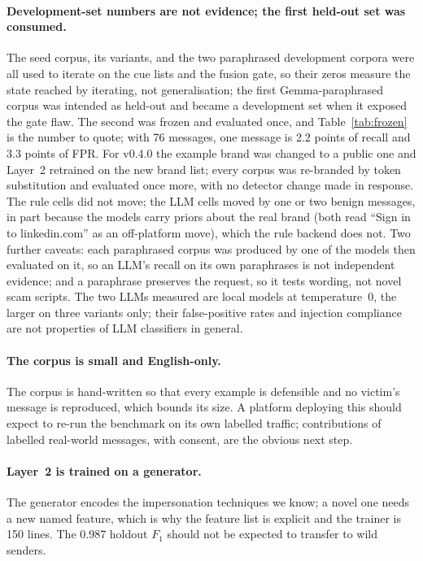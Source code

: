 \documentclass[10pt,twocolumn]{article}
\begin{document}
\paragraph{Development-set numbers are not evidence; the first held-out set was consumed.} The seed corpus, its variants, and the two paraphrased development corpora were all used to iterate on the cue lists and the fusion gate, so their zeros measure the state reached by iterating, not generalisation; the first Gemma-paraphrased corpus was intended as held-out and became a development set when it exposed the gate flaw. The second was frozen and evaluated once, and Table~\ref{tab:frozen} is the number to quote; with 76 messages, one message is 2.2 points of recall and 3.3 points of FPR. For v0.4.0 the example brand was changed to a public one and Layer~2 retrained on the new brand list; every corpus was re-branded by token substitution and evaluated once more, with no detector change made in response. The rule cells did not move; the LLM cells moved by one or two benign messages, in part because the models carry priors about the real brand (both read ``Sign in to linkedin.com'' as an off-platform move), which the rule backend does not. Two further caveats: each paraphrased corpus was produced by one of the models then evaluated on it, so an LLM's recall on its own paraphrases is not independent evidence; and a paraphrase preserves the request, so it tests wording, not novel scam scripts. The two LLMs measured are local models at temperature~0, the larger on three variants only; their false-positive rates and injection compliance are not properties of LLM classifiers in general.

\paragraph{The corpus is small and English-only.} The corpus is hand-written so that every example is defensible and no victim's message is reproduced, which bounds its size. A platform deploying this should expect to re-run the benchmark on its own labelled traffic; contributions of labelled real-world messages, with consent, are the obvious next step.

\paragraph{Layer~2 is trained on a generator.} The generator encodes the impersonation techniques we know; a novel one needs a new named feature, which is why the feature list is explicit and the trainer is 150 lines. The 0.987 holdout $F_1$ should not be expected to transfer to wild senders.
\end{document}
